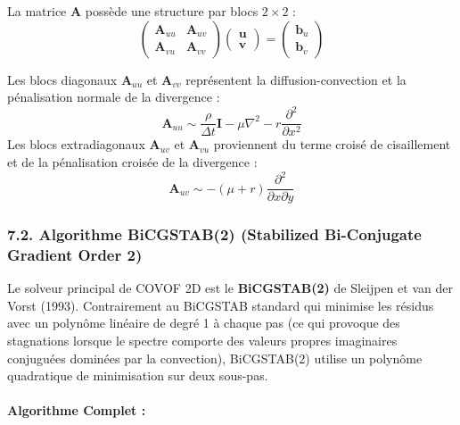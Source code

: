 \documentclass[
  french,
]{article}
\begin{document}
La matrice \(\mathbf{A}\) possède une structure par blocs \(2 \times 2\)
:
\[\begin{pmatrix} \mathbf{A}_{uu} & \mathbf{A}_{uv} \\ \mathbf{A}_{vu} & \mathbf{A}_{vv} \end{pmatrix} \begin{pmatrix} \mathbf{u} \\ \mathbf{v} \end{pmatrix} = \begin{pmatrix} \mathbf{b}_u \\ \mathbf{b}_v \end{pmatrix}\]

Les blocs diagonaux \(\mathbf{A}_{uu}\) et \(\mathbf{A}_{vv}\)
représentent la diffusion-convection et la pénalisation normale de la
divergence :
\[\mathbf{A}_{uu} \sim \frac{\rho}{\Delta t}\mathbf{I} - \mu \nabla^2 - r \frac{\partial^2}{\partial x^2}\]
Les blocs extradiagonaux \(\mathbf{A}_{uv}\) et \(\mathbf{A}_{vu}\)
proviennent du terme croisé de cisaillement et de la pénalisation
croisée de la divergence :
\[\mathbf{A}_{uv} \sim -(\mu + r) \frac{\partial^2}{\partial x \partial y}\]

\subsubsection{7.2. Algorithme BiCGSTAB(2) (Stabilized Bi-Conjugate
Gradient Order
2)}\label{algorithme-bicgstab2-stabilized-bi-conjugate-gradient-order-2}

Le solveur principal de COVOF 2D est le \textbf{BiCGSTAB(2)} de Sleijpen
et van der Vorst (1993). Contrairement au BiCGSTAB standard qui minimise
les résidus avec un polynôme linéaire de degré 1 à chaque pas (ce qui
provoque des stagnations lorsque le spectre comporte des valeurs propres
imaginaires conjuguées dominées par la convection), BiCGSTAB(2) utilise
un polynôme quadratique de minimisation sur deux sous-pas.

\paragraph{Algorithme Complet :}\label{algorithme-complet}
\end{document}
